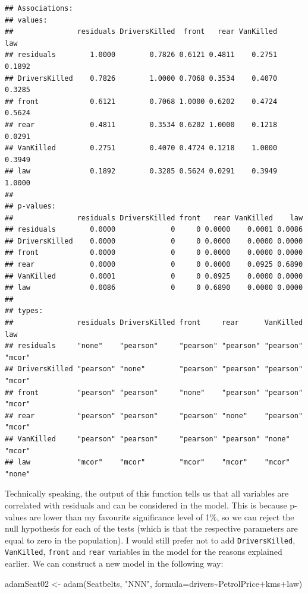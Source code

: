 \documentclass[
]{book}
\newenvironment{Shaded}{\begin{snugshade}}{\end{snugshade}}
\newcommand{\AttributeTok}[1]{\textcolor[rgb]{0.77,0.63,0.00}{#1}}
\newcommand{\FunctionTok}[1]{\textcolor[rgb]{0.00,0.00,0.00}{#1}}
\newcommand{\NormalTok}[1]{#1}
\newcommand{\OtherTok}[1]{\textcolor[rgb]{0.56,0.35,0.01}{#1}}
\newcommand{\SpecialCharTok}[1]{\textcolor[rgb]{0.00,0.00,0.00}{#1}}
\newcommand{\StringTok}[1]{\textcolor[rgb]{0.31,0.60,0.02}{#1}}
\theoremstyle{definition}
\theoremstyle{definition}
\theoremstyle{definition}
\theoremstyle{definition}
\theoremstyle{remark}
\begin{document}
\begin{verbatim}
## Associations: 
## values:
##               residuals DriversKilled  front   rear VanKilled    law
## residuals        1.0000        0.7826 0.6121 0.4811    0.2751 0.1892
## DriversKilled    0.7826        1.0000 0.7068 0.3534    0.4070 0.3285
## front            0.6121        0.7068 1.0000 0.6202    0.4724 0.5624
## rear             0.4811        0.3534 0.6202 1.0000    0.1218 0.0291
## VanKilled        0.2751        0.4070 0.4724 0.1218    1.0000 0.3949
## law              0.1892        0.3285 0.5624 0.0291    0.3949 1.0000
## 
## p-values:
##               residuals DriversKilled front   rear VanKilled    law
## residuals        0.0000             0     0 0.0000    0.0001 0.0086
## DriversKilled    0.0000             0     0 0.0000    0.0000 0.0000
## front            0.0000             0     0 0.0000    0.0000 0.0000
## rear             0.0000             0     0 0.0000    0.0925 0.6890
## VanKilled        0.0001             0     0 0.0925    0.0000 0.0000
## law              0.0086             0     0 0.6890    0.0000 0.0000
## 
## types:
##               residuals DriversKilled front     rear      VanKilled law   
## residuals     "none"    "pearson"     "pearson" "pearson" "pearson" "mcor"
## DriversKilled "pearson" "none"        "pearson" "pearson" "pearson" "mcor"
## front         "pearson" "pearson"     "none"    "pearson" "pearson" "mcor"
## rear          "pearson" "pearson"     "pearson" "none"    "pearson" "mcor"
## VanKilled     "pearson" "pearson"     "pearson" "pearson" "none"    "mcor"
## law           "mcor"    "mcor"        "mcor"    "mcor"    "mcor"    "none"
\end{verbatim}

Technically speaking, the output of this function tells us that all variables are correlated with residuals and can be considered in the model. This is because p-values are lower than my favourite significance level of 1\%, so we can reject the null hypothesis for each of the tests (which is that the respective parameters are equal to zero in the population). I would still prefer not to add \texttt{DriversKilled}, \texttt{VanKilled}, \texttt{front} and \texttt{rear} variables in the model for the reasons explained earlier. We can construct a new model in the following way:

\begin{Shaded}
\begin{Highlighting}[]
\NormalTok{adamSeat02 }\OtherTok{\textless{}{-}} \FunctionTok{adam}\NormalTok{(Seatbelts, }\StringTok{"NNN"}\NormalTok{,}
                   \AttributeTok{formula=}\NormalTok{drivers}\SpecialCharTok{\textasciitilde{}}\NormalTok{PetrolPrice}\SpecialCharTok{+}\NormalTok{kms}\SpecialCharTok{+}\NormalTok{law)}
\end{Highlighting}
\end{Shaded}
\end{document}
